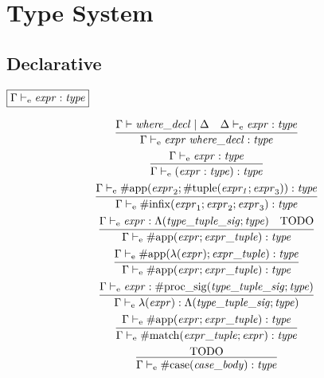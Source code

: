 \section{Type System}

\subsection{Declarative}

$\fbox{$\Gamma \vdash_\mathrm{e} \mathit{expr}: \mathit{type}$}$

\begin{gather*}
    \infer{\Gamma \vdash_\mathrm{e} \mathit{expr}\; \mathit{where\_decl}: \mathit{type}}{
        \Gamma \vdash \mathit{where\_decl} \mid \Delta
        &
        \Delta \vdash_\mathrm{e} \mathit{expr}: \mathit{type}
    }
    \\
    \infer{\Gamma \vdash_\mathrm{e} (\mathit{expr}: \mathit{type}): \mathit{type}}{
        \Gamma \vdash_\mathrm{e} \mathit{expr}: \mathit{type}
    }
    \\
    \infer{\Gamma \vdash_\mathrm{e} \mathrm{\#infix}(\mathit{expr}_1; \mathit{expr}_2; \mathit{expr}_3): \mathit{type}}{
        \Gamma \vdash_\mathrm{e} \mathrm{\#app}(\mathit{expr}_2; \mathrm{\#tuple}(\mathit{expr_1}; \mathit{expr}_3)): \mathit{type}
    }
    \\
    \infer{\Gamma \vdash_\mathrm{e} \mathrm{\#app}(\mathit{expr}; \mathit{expr\_tuple}): \mathit{type}}{
        \Gamma \vdash_\mathrm{e} \mathit{expr}: \Lambda(\mathit{type\_tuple\_sig}; \mathit{type})
        &
        \text{TODO}
    }
    \\
    \infer{\Gamma \vdash_\mathrm{e} \mathrm{\#app}(\mathit{expr}; \mathit{expr\_tuple}): \mathit{type}}{
        \Gamma \vdash_\mathrm{e} \mathrm{\#app}(\lambda(\mathit{expr}); \mathit{expr\_tuple}): \mathit{type}
    }
    \\
    \infer{\Gamma \vdash_\mathrm{e} \lambda(\mathit{expr}): \Lambda(\mathit{type\_tuple\_sig}; \mathit{type})}{
        \Gamma \vdash_\mathrm{e} \mathit{expr}: \mathrm{\#proc\_sig}(\mathit{type\_tuple\_sig}; \mathit{type})
    }
    \\
    \infer{\Gamma \vdash_\mathrm{e} \mathrm{\#match}(\mathit{expr\_tuple}; \mathit{expr}): \mathit{type}}{
        \Gamma \vdash_\mathrm{e} \mathrm{\#app}(\mathit{expr}; \mathit{expr\_tuple}): \mathit{type}
    }
    \\
    \infer{\Gamma \vdash_\mathrm{e} \mathrm{\#case}(\mathit{case\_body}): \mathit{type}}{
        \text{TODO}
    }
    \\

\end{gather*}
